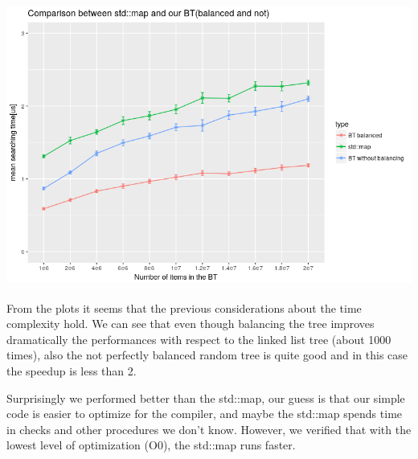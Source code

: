 \documentclass[a4paper,11pt]{article}
\begin{document}
\includegraphics[height=10cm]{./map_vs_BT.png}\\

From the plots it seems that the previous considerations about the time complexity hold.
We can see that even though balancing the tree improves dramatically the performances with respect to the linked list tree (about 1000 times), also the not perfectly balanced random tree is quite good and in this case the speedup is less than 2.

Surprisingly we performed better than the std::map, our guess is that our simple code is easier to optimize for the compiler, and maybe the std::map spends time in checks and other procedures we don't know.
However, we verified that with the lowest level of optimization (O0), the std::map runs faster.


\vspace{2cm}
\end{document}
